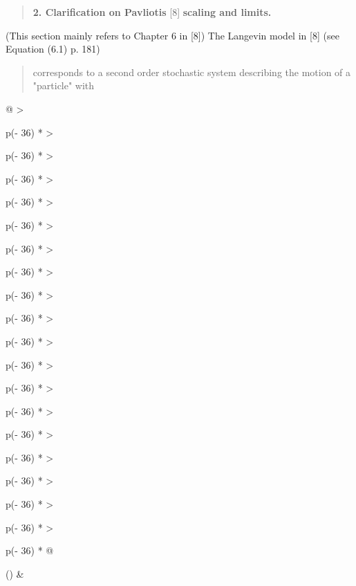 \documentclass[
]{article}
\begin{document}
\begin{quote}
\textbf{2. Clarification on Pavliotis} {[}8{]} \textbf{scaling and
limits.}
\end{quote}

(This section mainly refers to Chapter 6 in {[}8{]}) The Langevin model
in {[}8{]} (see Equation (6.1) p. 181)

\begin{quote}
corresponds to a second order stochastic system describing the motion of
a "particle" with
\end{quote}

\begin{longtable}[]{@{}
  >{\raggedright\arraybackslash}p{(\columnwidth - 36\tabcolsep) * }
  >{\raggedright\arraybackslash}p{(\columnwidth - 36\tabcolsep) * }
  >{\raggedright\arraybackslash}p{(\columnwidth - 36\tabcolsep) * }
  >{\raggedright\arraybackslash}p{(\columnwidth - 36\tabcolsep) * }
  >{\raggedright\arraybackslash}p{(\columnwidth - 36\tabcolsep) * }
  >{\raggedright\arraybackslash}p{(\columnwidth - 36\tabcolsep) * }
  >{\raggedright\arraybackslash}p{(\columnwidth - 36\tabcolsep) * }
  >{\raggedright\arraybackslash}p{(\columnwidth - 36\tabcolsep) * }
  >{\raggedright\arraybackslash}p{(\columnwidth - 36\tabcolsep) * }
  >{\raggedright\arraybackslash}p{(\columnwidth - 36\tabcolsep) * }
  >{\raggedright\arraybackslash}p{(\columnwidth - 36\tabcolsep) * }
  >{\raggedright\arraybackslash}p{(\columnwidth - 36\tabcolsep) * }
  >{\raggedright\arraybackslash}p{(\columnwidth - 36\tabcolsep) * }
  >{\raggedright\arraybackslash}p{(\columnwidth - 36\tabcolsep) * }
  >{\raggedright\arraybackslash}p{(\columnwidth - 36\tabcolsep) * }
  >{\raggedright\arraybackslash}p{(\columnwidth - 36\tabcolsep) * }
  >{\raggedright\arraybackslash}p{(\columnwidth - 36\tabcolsep) * }
  >{\raggedright\arraybackslash}p{(\columnwidth - 36\tabcolsep) * }
  >{\raggedright\arraybackslash}p{(\columnwidth - 36\tabcolsep) * }@{}}
\toprule()
 &
\end{longtable}
\end{document}
